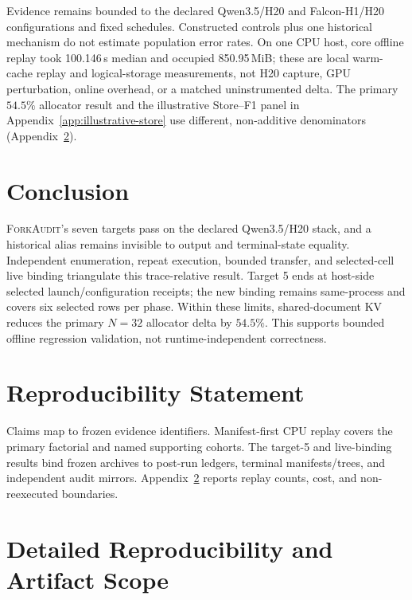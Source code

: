 \documentclass{article}
\newcommand{\method}{\textsc{ForkAudit}}
\begin{document}
Evidence remains bounded to the declared Qwen3.5/H20 and Falcon-H1/H20
configurations and fixed schedules.  Constructed controls plus one historical
mechanism do not estimate population error rates.  On one CPU host, core
offline replay took 100.146\,s median and occupied 850.95\,MiB; these are local
warm-cache replay and logical-storage measurements, not H20 capture, GPU
perturbation, online overhead, or a matched uninstrumented delta.  The primary
$54.5\%$ allocator result and the illustrative Store--F1 panel in
Appendix~\ref{app:illustrative-store} use different, non-additive denominators
(Appendix~\ref{app:reproducibility}).

\FloatBarrier

\section{Conclusion}

\method{}'s seven targets pass on the declared Qwen3.5/H20 stack, and a
historical alias remains invisible to output and terminal-state equality.
Independent enumeration, repeat execution, bounded transfer, and selected-cell
live binding triangulate this trace-relative result.  Target 5 ends at host-side
selected launch/configuration receipts; the new binding remains same-process and covers
six selected rows per phase.  Within these limits, shared-document KV reduces
the primary $N=32$ allocator delta by $54.5\%$.  This supports bounded offline
regression validation, not runtime-independent correctness.

\section*{Reproducibility Statement}
Claims map to frozen evidence identifiers.  Manifest-first CPU replay covers
the primary factorial and named supporting cohorts.  The target-5 and
live-binding results bind frozen archives to post-run ledgers, terminal
manifests/trees, and independent audit mirrors.  Appendix~\ref{app:reproducibility}
reports replay counts, cost, and non-reexecuted boundaries.




\appendix

\section{Detailed Reproducibility and Artifact Scope}
\label{app:reproducibility}
\end{document}
